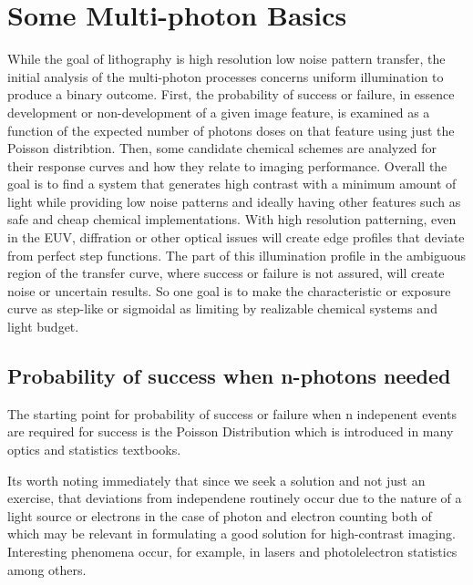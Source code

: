

\section{Some Multi-photon Basics }

While the goal of lithography is high resolution low noise pattern
transfer, the initial analysis of the multi-photon processes
concerns uniform illumination to produce a binary outcome.
First, the probability of success or failure, in essence development
or non-development of a given image feature, is examined as a function
of the expected number of photons doses on that feature using
just the Poisson distribtion. Then, some candidate chemical
schemes are analyzed for their response curves and how they relate
to imaging performance.  Overall the goal is to find a 
system that generates high contrast with a minimum amount of light
while providing low noise patterns and ideally having other features
such as safe and cheap chemical implementations.   
With high resolution patterning, even in the EUV, diffration or other
optical issues will create edge profiles that deviate from perfect
step functions. The part of this illumination profile in the 
ambiguous region of the transfer curve, where success or failure
is not assured, will create noise or uncertain results. So one 
goal is to make the characteristic or exposure curve as step-like
or sigmoidal as limiting by realizable chemical systems and light budget. 

\subsection{ Probability of success when n-photons needed }


The starting point for probability of success or failure when n
indepenent events are required for success is the Poisson Distribution
which is introduced in many optics and statistics textbooks.


Its worth noting immediately that since we seek a solution and not
just an exercise, that deviations from independene routinely occur
due to the nature of a light source or electrons in the case
of photon and electron counting
\cite{Saito_Endo_Kodama_Electron_counting_theory_1992}
\cite{Ban_Theory_electron_counting_1994}
 both of which may be relevant in formulating a good solution for high-contrast imaging.
Interesting phenomena occur, for example,  in lasers
\cite{Teich_Saleh_Photon_Bunching_1988}
and photolelectron statistics
\cite{Meng_Poisson_photoelectron_statistics_1995}
among others. 


